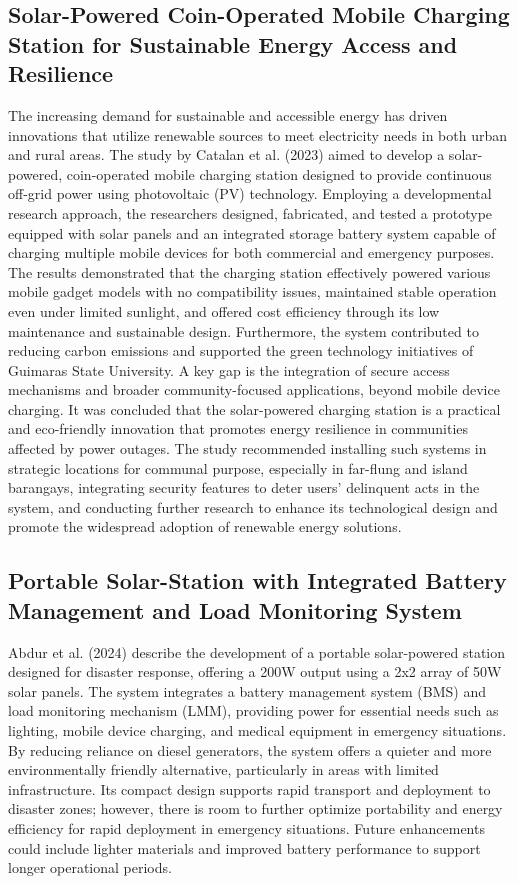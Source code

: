 {\subsection{Solar-Powered Coin-Operated Mobile Charging Station for Sustainable Energy Access and Resilience}
The increasing demand for sustainable and accessible energy has driven innovations that utilize renewable sources to meet electricity needs in both urban and rural areas. The study by Catalan et al. (2023) aimed to develop a solar-powered, coin-operated mobile charging station designed to provide continuous off-grid power using photovoltaic (PV) technology. Employing a developmental research approach, the researchers designed, fabricated, and tested a prototype equipped with solar panels and an integrated storage battery system capable of charging multiple mobile devices for both commercial and emergency purposes. The results demonstrated that the charging station effectively powered various mobile gadget models with no compatibility issues, maintained stable operation even under limited sunlight, and offered cost efficiency through its low maintenance and sustainable design. Furthermore, the system contributed to reducing carbon emissions and supported the green technology initiatives of Guimaras State University. A key gap is the integration of secure access mechanisms and broader community-focused applications, beyond mobile device charging. It was concluded that the solar-powered charging station is a practical and eco-friendly innovation that promotes energy resilience in communities affected by power outages. The study recommended installing such systems in strategic locations for communal purpose, especially in far-flung and island barangays, integrating security features to deter users’ delinquent acts in the system, and conducting further research to enhance its technological design and promote the widespread adoption of renewable energy solutions.

\subsection{Portable Solar-Station with Integrated Battery Management and Load Monitoring System}
Abdur et al. (2024) describe the development of a portable solar-powered station designed for disaster response, offering a 200W output using a 2x2 array of 50W solar panels. The system integrates a battery management system (BMS) and load monitoring mechanism (LMM), providing power for essential needs such as lighting, mobile device charging, and medical equipment in emergency situations. By reducing reliance on diesel generators, the system offers a quieter and more environmentally friendly alternative, particularly in areas with limited infrastructure. Its compact design supports rapid transport and deployment to disaster zones; however, there is room to further optimize portability and energy efficiency for rapid deployment in emergency situations. Future enhancements could include lighter materials and improved battery performance to support longer operational periods.

}
